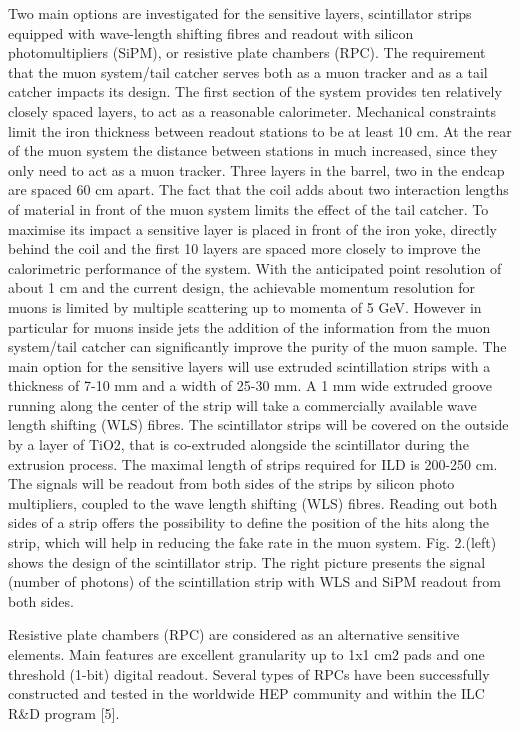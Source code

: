Two main options are investigated for the sensitive layers, scintillator strips equipped with wave-length shifting fibres and readout with silicon photomultipliers (SiPM), or resistive plate chambers (RPC).
The requirement that the muon system/tail catcher serves both as a muon tracker and as a tail catcher impacts its design. The first section of the system provides ten relatively closely spaced layers, to act as a reasonable calorimeter. Mechanical constraints limit the iron thickness between readout stations to be at least 10 cm. At the rear of the muon system the distance between stations in much increased, since they only need to act as a muon tracker. Three layers in the barrel, two in the endcap are spaced 60 cm apart. The fact that the coil adds about two interaction lengths of material in front of the muon system limits the effect of the tail catcher. To maximise its impact a sensitive layer is placed in front of the iron yoke, directly behind the coil and the first 10 layers are spaced more closely to improve the calorimetric performance of the system.
With the anticipated point resolution of about 1 cm and the current design, the
achievable momentum resolution for muons is limited by multiple scattering up to
momenta of 5 GeV. However in particular for muons inside jets the addition of the
information from the muon system/tail catcher can significantly improve the purity of the muon sample.
The main option for the sensitive layers will use extruded scintillation strips with a thickness of 7-10 mm and a width of 25-30 mm. A 1 mm wide extruded groove running along the center of the strip will take a commercially available wave length shifting (WLS) fibres. The scintillator strips will be covered on the outside by a layer of TiO2, that is co-extruded alongside the scintillator during the extrusion process. The maximal length of strips required for ILD is 200-250 cm. The signals will be readout from both sides of the strips by silicon photo multipliers, coupled to the wave length shifting (WLS) fibres. Reading out both sides of a strip offers the possibility to define the position of the hits along the strip, which will help in reducing the fake rate in the muon system. Fig. 2.(left) shows the design of the scintillator strip. The right picture presents the signal (number of photons) of the scintillation strip with WLS and SiPM readout from both sides.



Resistive plate chambers (RPC) are considered as an alternative sensitive elements. Main features are excellent granularity up to 1x1 cm2 pads and one
threshold (1-bit) digital readout. Several types of RPCs have been successfully constructed and tested in the worldwide HEP community and within the ILC R\&D program [5].



